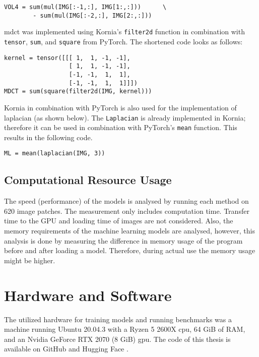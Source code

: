 \begin{lstlisting}
VOL4 = sum(mul(IMG[:-1,:], IMG[1:,:]))      \
        - sum(mul(IMG[:-2,:], IMG[2:,:]))
\end{lstlisting}


\Ac{mdct} was implemented using Kornia's \texttt{filter2d} function in combination with \texttt{tensor}, \texttt{sum}, and \texttt{square} from PyTorch. The shortened code looks as follows:


\begin{lstlisting}
kernel = tensor([[[ 1,  1, -1, -1],
                  [ 1,  1, -1, -1],
                  [-1, -1,  1,  1],
                  [-1, -1,  1,  1]]])
MDCT = sum(square(filter2d(IMG, kernel)))
\end{lstlisting}

Kornia in combination with PyTorch is also used for the implementation of \ac{laplacian} (as shown below). The \texttt{Laplacian} is already implemented in Kornia; therefore it can be used in combination with PyTorch's \texttt{mean} function. This results in the following code.

\begin{lstlisting}
ML = mean(laplacian(IMG, 3))
\end{lstlisting}

\subsection{Computational Resource Usage}
\label{sec:Methods:Evaluation:Computation}

The speed (performance) of the models is analysed by running each method on 620 image patches. The measurement only includes computation time. Transfer time to the GPU and loading time of images are not considered. Also, the memory requirements of the machine learning models are analysed, however, this analysis is done by measuring the difference in memory usage of the program before and after loading a model. Therefore, during actual use the memory usage might be higher.

\section{Hardware and Software}
\label{sec:Methods:Hardware}

The utilized hardware for training models and running benchmarks was a machine running Ubuntu 20.04.3 with a Ryzen 5 2600X \ac{cpu}, 64 GiB of RAM, and an Nvidia GeForce RTX 2070 (8 GiB) \ac{gpu}. The code of this thesis is available on GitHub and Hugging Face \cite{kuchelmeister2022code}.
